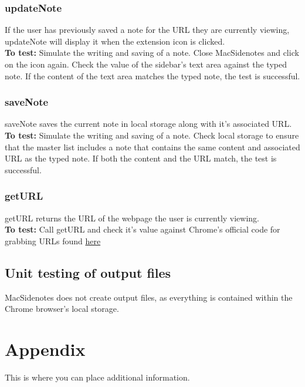 \documentclass[12pt, titlepage]{article}
\begin{document}
\subsubsection{updateNote}
	If the user has previously saved a note for the URL they are currently 
	viewing, updateNote will display it when the extension icon is clicked.\\
	\textbf{To test:} Simulate the writing and saving of a note. Close 
	MacSidenotes and 
	click on the icon again. Check the value of the sidebar's text area against 
	the typed note. If the content of the text area matches the typed note, the 
	test is successful.
\subsubsection{saveNote}
	saveNote saves the current note in local storage along with it's associated 
	URL.\\
	\textbf{To test:} Simulate the writing and saving of a note. Check local 
	storage to ensure that the master list includes a note that contains the 
	same content and associated URL as the typed note. If both the content and 
	the URL match, the test is successful.
\subsubsection{getURL}
	getURL returns the URL of the webpage the user is currently viewing.\\
	\textbf{To test:} Call getURL and check it's value against Chrome's 
	official code for grabbing URLs found 
	\href{https://developer.chrome.com/extensions/tabs}{here} 

\subsection{Unit testing of output files}		

MacSidenotes does not create output files, as everything is contained within 
the Chrome browser's local storage.





\newpage

\section{Appendix}

This is where you can place additional information.
\end{document}
